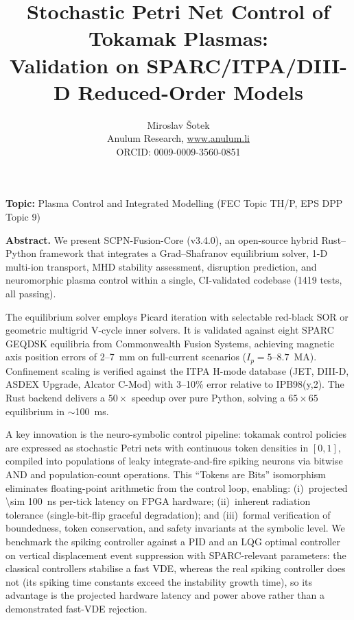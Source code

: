 \documentclass[12pt]{article}
\title{Stochastic Petri Net Control of Tokamak Plasmas:\\
       Validation on SPARC/ITPA/DIII-D Reduced-Order Models}
\author{
  Miroslav \v{S}otek \\[2pt]
  {\small Anulum Research, \url{www.anulum.li}} \\
  {\small ORCID: 0009-0009-3560-0851}
}
\date{}
\begin{document}
\maketitle
\thispagestyle{empty}

\noindent\textbf{Topic:} Plasma Control and Integrated Modelling (FEC
Topic TH/P, EPS DPP Topic 9)

\bigskip

\noindent\textbf{Abstract.}
We present SCPN-Fusion-Core (v3.4.0), an open-source hybrid
Rust--Python framework that integrates a Grad--Shafranov equilibrium
solver, 1-D multi-ion transport, MHD stability assessment, disruption
prediction, and neuromorphic plasma control within a single,
CI-validated codebase (1419 tests, all passing).

The equilibrium solver employs Picard iteration with selectable
red-black SOR or geometric multigrid V-cycle inner solvers.  It is
validated against eight SPARC GEQDSK equilibria from Commonwealth
Fusion Systems, achieving magnetic axis position errors of 2--7~mm on
full-current scenarios ($I_p = 5$--$8.7$~MA).  Confinement scaling is
verified against the ITPA H-mode database (JET, DIII-D, ASDEX Upgrade,
Alcator C-Mod) with 3--10\% error relative to IPB98(y,2).  The Rust
backend delivers a $50\times$ speedup over pure Python, solving a
$65 \times 65$ equilibrium in $\sim$\SI{100}{\milli\second}.

A key innovation is the neuro-symbolic control pipeline: tokamak
control policies are expressed as stochastic Petri nets with
continuous token densities in $[0,1]$, compiled into populations of
leaky integrate-and-fire spiking neurons via bitwise AND and
population-count operations.  This ``Tokens are Bits'' isomorphism
eliminates floating-point arithmetic from the control loop, enabling:
(i)~projected \SI{\sim 100}{\nano\second} per-tick latency on FPGA
hardware; (ii)~inherent radiation tolerance (single-bit-flip graceful
degradation); and (iii)~formal verification of boundedness, token
conservation, and safety invariants at the symbolic level.  We
benchmark the spiking controller against a PID and an LQG optimal
controller on vertical displacement event suppression with
SPARC-relevant parameters: the classical controllers stabilise a fast
VDE, whereas the real spiking controller does not (its spiking time
constants exceed the instability growth time), so its advantage is the
projected hardware latency and power above rather than a demonstrated
fast-VDE rejection.
\end{document}
